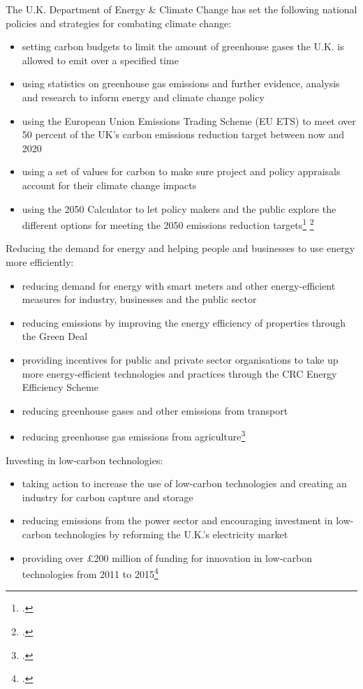 The U.K. Department of Energy \& Climate Change has set the following national policies and strategies for combating climate change:
\begin{itemize}
	\item setting carbon budgets to limit the amount of greenhouse gases the U.K. is allowed to emit over a specified time
	\item using statistics on greenhouse gas emissions and further evidence, analysis and research to inform energy and climate change policy
	\item using the European Union Emissions Trading Scheme (EU ETS) to meet over 50 percent of the UK's carbon emissions reduction target between now and 2020
	\item using a set of values for carbon to make sure project and policy appraisals account for their climate change impacts
	\item using the 2050 Calculator to let policy makers and the public explore the different options for meeting the 2050 emissions reduction targets\footcite[][]{UKgovnt} \footcite[][]{EUETS}
\end{itemize}



Reducing the demand for energy and helping people and businesses to use energy more efficiently:
\begin{itemize}
	\item reducing demand for energy with smart meters and other energy-efficient measures for industry, businesses and the public sector
	\item reducing emissions by improving the energy efficiency of properties through the Green Deal
	\item providing incentives for public and private sector organisations to take up more energy-efficient technologies and practices through the CRC Energy Efficiency Scheme 
	\item reducing greenhouse gases and other emissions from transport
	\item reducing greenhouse gas emissions from agriculture\footcite[][]{UKgovnt}
\end{itemize}



Investing in low-carbon technologies:
\begin{itemize}
	\item taking action to increase the use of low-carbon technologies and creating an industry for carbon capture and storage
	\item reducing emissions from the power sector and encouraging investment in low-carbon technologies by reforming the U.K.'s electricity market
	\item providing over £200 million of funding for innovation in low-carbon technologies from 2011 to 2015\footcite[][]{UKgovnt}
\end{itemize}



